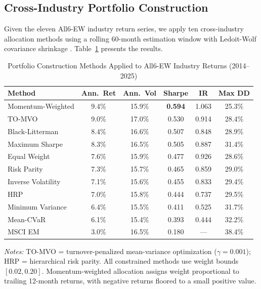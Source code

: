 \documentclass[12pt]{article}
\begin{document}
\subsection{Cross-Industry Portfolio Construction}

Given the eleven All6-EW industry return series, we apply ten cross-industry allocation methods using a rolling 60-month estimation window with Ledoit-Wolf covariance shrinkage \citep{ledoitwolf2004}. Table~\ref{tab:pc} presents the results.

\begin{table}[H]
\centering
\caption{Portfolio Construction Methods Applied to All6-EW Industry Returns (2014--2025)}
\label{tab:pc}
\small
\begin{tabular}{lccccc}
\toprule
\textbf{Method} & \textbf{Ann.\ Ret} & \textbf{Ann.\ Vol} & \textbf{Sharpe} & \textbf{IR} & \textbf{Max DD} \\
\midrule
Momentum-Weighted  & 9.4\%  & 15.9\% & \textbf{0.594} & 1.063 & 25.3\% \\
TO-MVO             & 9.0\%  & 17.0\% & 0.530 & 0.914 & 28.4\% \\
Black-Litterman    & 8.4\%  & 16.6\% & 0.507 & 0.848 & 28.9\% \\
Maximum Sharpe     & 8.3\%  & 16.5\% & 0.505 & 0.887 & 31.4\% \\
Equal Weight       & 7.6\%  & 15.9\% & 0.477 & 0.926 & 28.6\% \\
Risk Parity        & 7.3\%  & 15.7\% & 0.465 & 0.859 & 29.0\% \\
Inverse Volatility & 7.1\%  & 15.6\% & 0.455 & 0.833 & 29.4\% \\
HRP                & 7.0\%  & 15.8\% & 0.444 & 0.737 & 29.5\% \\
Minimum Variance   & 6.4\%  & 15.5\% & 0.411 & 0.525 & 31.7\% \\
Mean-CVaR          & 6.1\%  & 15.4\% & 0.393 & 0.444 & 32.2\% \\
\midrule
MSCI EM            & 3.0\%  & 16.5\% & 0.180 & ---   & 38.4\% \\
\bottomrule
\end{tabular}
\begin{minipage}{0.92\textwidth}
\vspace{0.3em}
\footnotesize
\textit{Notes:} TO-MVO = turnover-penalized mean-variance optimization ($\gamma = 0.001$); HRP = hierarchical risk parity. All constrained methods use weight bounds $[0.02, 0.20]$. Momentum-weighted allocation assigns weight proportional to trailing 12-month returns, with negative returns floored to a small positive value.
\end{minipage}
\end{table}
\end{document}
